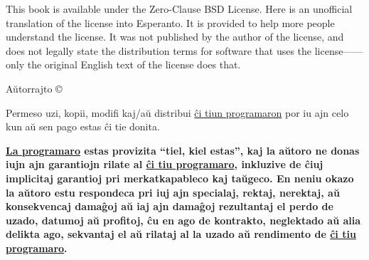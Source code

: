 \begingroup
\renewcommand{\thepage}{a}
\maketitle
\endgroup
\clearpage

\setcounter{page}{2}%
\thispagestyle{empty}%

\begingroup
\setlength{\parindent}{1.5em}%

\noindent%
%
{This book is available under the Zero-Clause BSD License.}
%
{Here is an unofficial translation of the license into Esperanto.}
%
{It is provided to help more people understand the license.}
%
{It was not published by the author of the license,}
%
{and does not legally state the distribution terms for software}
%
{that uses the license—}—%
%
{only the original English text of the license does that.}

\vspace{1.5ex}


Aŭtorrajto © \thedate{} \theauthor{}

Permeso uzi, kopii, modifi kaj/aŭ distribui
\href{https://github.com/septsea/det}{ĉi tiun programaron}
por iu ajn celo kun aŭ sen pago estas ĉi tie donita.

\textbf{%
    \href{https://github.com/septsea/det}{La programaro}
    estas provizita ``tiel, kiel estas'', kaj la aŭtoro ne donas iujn ajn garantiojn rilate al
    \href{https://github.com/septsea/det}{ĉi tiu programaro},
    inkluzive de ĉiuj implicitaj garantioj pri merkatkapableco kaj taŭgeco. En neniu okazo la aŭtoro estu respondeca pri iuj ajn specialaj, rektaj, nerektaj, aŭ konsekvencaj damaĝoj aŭ iaj ajn damaĝoj rezultantaj el perdo de uzado, datumoj aŭ profitoj, ĉu en ago de kontrakto, neglektado aŭ alia delikta ago, sekvantaj el aŭ rilataj al la uzado aŭ rendimento de
    \href{https://github.com/septsea/det}{ĉi tiu programaro}.%
}

